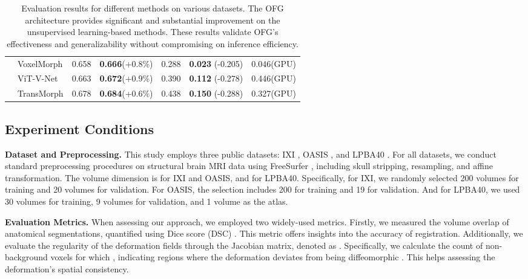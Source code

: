 \documentclass[10pt,twocolumn,letterpaper]{article}
\begin{document}
\begin{table*}[t]
\begin{center}
{{\begin{tabular}{llccccc}
    & VoxelMorph \cite{Balakrishnan_2019} & 0.658 & \textbf{0.666}(+0.8\%) & 0.288 & \textbf{0.023} (-0.205) & 0.046(GPU) \\
    & ViT-V-Net \cite{chen2021vitvnet} & 0.663 & \textbf{0.672}(+0.9\%) & 0.390 & \textbf{0.112} (-0.278) & 0.446(GPU) \\
    & TransMorph \cite{Chen_2022} & 0.678 & \textbf{0.684}(+0.6\%) & 0.438 & \textbf{0.150} (-0.288) & 0.327(GPU) \\
    \bottomrule
    \end{tabular}
    }}
    \end{center}
\caption{Evaluation results for different methods on various datasets. The OFG architecture provides significant and substantial improvement on the unsupervised learning-based methods. These results validate OFG's effectiveness and generalizability without compromising on inference efficiency.} \label{tab:results}
\end{table*}


\subsection{Experiment Conditions}


\textbf{Dataset and Preprocessing.} This study employs three public datasets: IXI \cite{ixi}, OASIS \cite{10.1162/jocn.2007.19.9.1498}, and LPBA40 \cite{lpba}. For all datasets, we conduct standard preprocessing procedures on structural brain MRI data using FreeSurfer \cite{freesurfer}, including skull stripping, resampling, and affine transformation. The volume dimension is  for IXI and OASIS, and  for LPBA40. Specifically, for IXI, we randomly selected 200 volumes for training and 20 volumes for validation. For OASIS, the selection includes 200 for training and 19 for validation. And for LPBA40, we used 30 volumes for training, 9 volumes for validation, and 1 volume as the atlas.

\textbf{Evaluation Metrics.} When assessing our approach, we employed two widely-used metrics. Firstly, we measured the volume overlap of anatomical segmentations, quantified using Dice score (DSC) \cite{Balakrishnan_2019, mul1989com}. This metric offers insights into the accuracy of registration. Additionally, we evaluate the regularity of the deformation fields through the Jacobian matrix, denoted as . Specifically, we calculate the count of non-background voxels for which , indicating regions where the deformation deviates from being diffeomorphic \cite{afas2007neu}. This helps assessing the deformation's spatial consistency.
\end{document}
